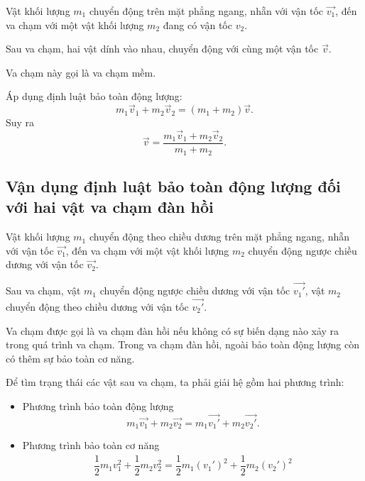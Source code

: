 Vật khối lượng $m_1$ chuyển động trên mặt phẳng ngang, nhẵn với vận tốc $\vec{v_1}$, đến va chạm với một vật khối lượng $m_2$ đang có vận tốc $v_2$. 

Sau va chạm, hai vật dính vào nhau, chuyển động với cùng một vận tốc $\vec{v}$.

Va chạm này gọi là va chạm mềm.

Áp dụng định luật bảo toàn động lượng:
\begin{equation*}
	m_1\vec{v}_1+ m_2\vec{v}_2 = (m_1+m_2)\vec{v}.
\end{equation*}
Suy ra 
\begin{equation*}
	\vec{v}=\dfrac{m_1\vec{v}_1+m_2\vec{v}_2}{m_1+m_2}.
\end{equation*}

\subsection{Vận dụng định luật bảo toàn động lượng đối với hai vật va chạm đàn hồi}

Vật khối lượng $m_1$ chuyển động theo chiều dương trên mặt phẳng ngang, nhẵn với vận tốc $\vec{v_1}$, đến va chạm với một vật khối lượng $m_2$ chuyển động ngược chiều dương với vận tốc $\vec{v_2}$. 

Sau va chạm, vật $m_1$ chuyển động ngược chiều dương với vận tốc $\vec{v_1'}$, vật $m_2$ chuyển động theo chiều dương với vận tốc $\vec{v_2'}$.

Va chạm được gọi là va chạm đàn hồi nếu không có sự biến dạng nào xảy ra trong quá trình va chạm. Trong va chạm đàn hồi, ngoài bảo toàn động lượng còn có thêm sự bảo toàn cơ năng. 

Để tìm trạng thái các vật sau va chạm, ta phải giải hệ gồm hai phương trình:
\begin{itemize}
	\item Phương trình bảo toàn động lượng 
	\begin{equation*}
		m_1\vec{v_1}+ m_2\vec{v_2} = m_1\vec{v_1'}+m_2\vec{v_2'}.
	\end{equation*}
	\item Phương trình bảo toàn cơ năng 
	\begin{align*}
		\dfrac{1}{2}m_1v_1^2+\dfrac{1}{2}m_2v_2^2=\dfrac{1}{2}m_1(v_1')^2+\dfrac{1}{2}m_2(v_2')^2
	\end{align*}
\end{itemize}
